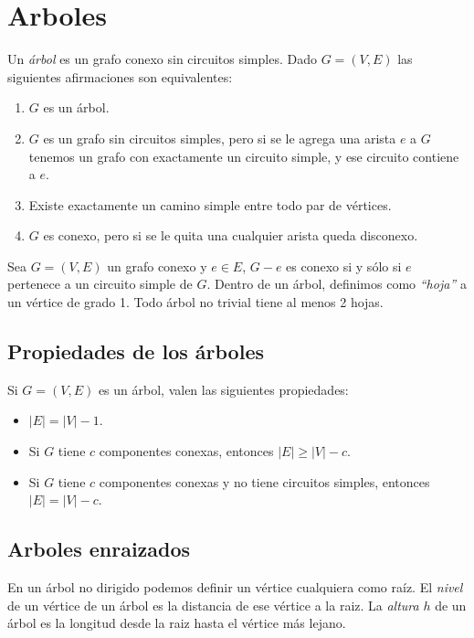\newpage
\section{Arboles}

Un \emph{\'arbol} es un grafo conexo sin circuitos simples. Dado $G=(V,E)$ las siguientes afirmaciones son equivalentes:

\begin{enumerate}
\item $G$ es un \'arbol.
\item $G$ es un grafo sin circuitos simples, pero si se le agrega una arista $e$ a $G$ tenemos un grafo con exactamente un circuito simple, y ese circuito contiene a $e$.
\item Existe exactamente un camino simple entre todo par de v\'ertices.
\item $G$ es conexo, pero si se le quita una cualquier arista queda disconexo.
\end{enumerate}

Sea $G=(V,E)$ un grafo conexo y $e \in E$, $G-e$ es conexo si y s\'olo si $e$ pertenece a un circuito simple de $G$. Dentro de un \'arbol, definimos como \emph{``hoja''} a un v\'ertice de grado 1. Todo \'arbol no trivial tiene al menos 2 hojas.

\subsection{Propiedades de los \'arboles}

Si $G = (V,E)$ es un \'arbol, valen las siguientes propiedades:

\begin{itemize}
\item $|E| = |V| - 1$.
\item Si $G$ tiene $c$ componentes conexas, entonces $|E| \geq |V| - c$.
\item Si $G$ tiene $c$ componentes conexas y no tiene circuitos simples, entonces $|E| =|V|-c$.
\end{itemize}

\subsection{Arboles enraizados}

En un \'arbol no dirigido podemos definir un v\'ertice cualquiera como ra\'iz. El \emph{nivel} de un v\'ertice de un \'arbol es la distancia de ese v\'ertice a la raiz. La \emph{altura} $h$ de un \'arbol es la longitud desde la raiz hasta el v\'ertice m\'as lejano. 


